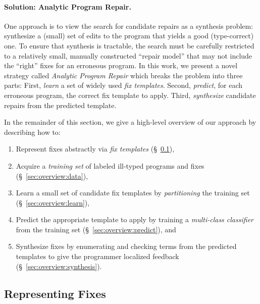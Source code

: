 \paragraph{Solution: Analytic Program Repair.}
%
One approach is to view the search for candidate repairs
as a synthesis problem: synthesize a (small) set of edits
to the program that yields a good (\eg type-correct) one.
%
To ensure that synthesis is tractable, the search must be
carefully restricted to a relatively small, manually constructed
``repair model'' that may not include the ``right'' fixes for
an erroneous program.
%
In this work, we present a novel strategy called
\emph{Analytic Program Repair} which breaks the
problem into three parts:
%
First, \emph{learn} a set of widely used \emph{fix templates}.
%
Second, \emph{predict}, for each erroneous program, the correct fix template to apply.
%
Third, \emph{synthesize} candidate repairs from the predicted template.

In the remainder of this section, we give a high-level overview
of our approach by describing how to:

\begin{enumerate}

  \item Represent fixes abstractly via \emph{fix templates}
        (\S~\ref{sec:overview:templates}),

  \item Acquire a \emph{training set} of labeled ill-typed programs and fixes
        (\S~\ref{sec:overview:data}),

  \item Learn a small set of candidate fix templates by \emph{partitioning}
        the training set (\S~\ref{sec:overview:learn}),

  \item Predict the appropriate template to apply by training a
        \emph{multi-class classifier} from the training set
        (\S~\ref{sec:overview:predict}), and

  \item Synthesize fixes by enumerating and checking terms from the
        predicted templates to give the programmer localized feedback
        (\S~\ref{sec:overview:synthesis}).
\end{enumerate}

\subsection{Representing Fixes}
\label{sec:overview:templates}

